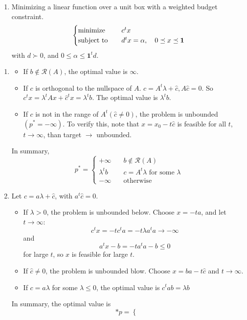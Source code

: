 \begin{problem}[4.8]
\begin{enumerate}
        \item Minimizing a linear function over a unit box with a weighted budget constraint.\[\begin{cases}
            \operatorname{minimize} \quad & c^tx \\
            \operatorname{subject\ to} \quad &d^tx = \alpha, \quad 0 \preceq x \preceq \textbf{1}
        \end{cases}\] with $d \succ 0$, and $0 \le \alpha \le \textbf{1}^td$.
    \end{enumerate}
    \Answer \text{} \begin{enumerate}
        \item \begin{itemize}
            \item If $b \notin \mathcal{R}(A)$, the optimal value is $\infty$.
            \item If $c$ is orthogonal to the nullspace of $A$. $c = A^t\lambda + \hat{c}, A\hat{c} = 0$. So $c^tx = \lambda^tAx + \hat{c}^tx = \lambda^tb$. The optimal value is $\lambda^tb$.
            \item If $c$ is not in the range of $A^t(\hat{c}\neq 0)$, the problem is unbounded$(p^* = -\infty)$. To verify this, note that $x = x_0 - t\hat{c}$ is feasible for all $t$, $t \to \infty$, than target $\to $ unbounded.
        \end{itemize}
        In summary, \[p^* = \begin{cases}
            +\infty \quad &b \notin \mathcal{R}(A)\\
            \lambda^tb\quad &c = A^t\lambda \text{ for some } \lambda\\
            -\infty \quad &\text{otherwise}
        \end{cases}\]
        \item Let $c = a\lambda + \hat{c}$, with $a^t\hat{c} = 0$.\begin{itemize}
            \item If $\lambda > 0$, the problem is unbounded below. Choose $x = -ta$, and let $t \to \infty$:\[c^tx = -tc^ta = -t\lambda a^ta \to -\infty\] and \[a^tx - b = -ta^ta - b \le 0\] for large $t$, so $x$ is feasible for large $t$. 
            \item If $\hat{c} \neq 0$, the problem is unbounded blow. Choose $x = ba - t\hat{c}$ and $t \to \infty$.
            \item If $c = a\lambda$ for some $\lambda \le 0$, the optimal value is $c^tab = \lambda b$
        \end{itemize}
        In summary, the optimal value is \[*p = \begin{cases}

\end{cases}\]
\end{enumerate}
\end{problem}
